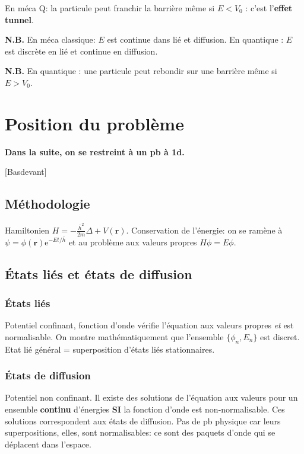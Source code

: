 \documentclass[11pt]{report}
\numberwithin{figure}{section}
\numberwithin{equation}{section}
\numberwithin{table}{section}
\newcommand{\e}{\mathrm{e}}
\newcommand{\1}{\boldsymbol{1}}
\begin{document}
En méca Q: la particule peut franchir la barrière même si $E < V_0$ : c'est l'\textbf{effet tunnel}.

\textbf{N.B.} En méca classique: $E$ est continue dans lié et diffusion. En quantique : $E$ est discrète en lié et continue en diffusion. 

\textbf{N.B.} En quantique : une particule peut rebondir sur une barrière même si $E > V_0$.

\section{Position du problème}  

\textbf{Dans la suite, on se restreint à un pb à 1d.}


[Basdevant] 
  
\subsection{Méthodologie}

Hamiltonien $H = - \frac{\bar{h}^2}{2m} \Delta + V(\bm r)$. Conservation de l'énergie: on se ramène à $\psi = \phi(\bm r) \e^{-Et/\bar{h}}$ et au problème aux valeurs propres $H \phi = E \phi$.


\subsection{États liés et états de diffusion}

\subsubsection{États liés}

Potentiel confinant, fonction d'onde vérifie l'équation aux valeurs propres \emph{et} est normalisable.
On montre mathématiquement que l'ensemble $\{\phi_n, E_n\}$ est discret. Etat lié général = superposition d'états liés stationnaires. 

\subsubsection{États de diffusion}

Potentiel non confinant. Il existe des solutions de l'équation aux valeurs pour un ensemble \textbf{continu} d'énergies \textbf{SI} la fonction d'onde est non-normalisable. Ces solutions correspondent aux états de diffusion. Pas de pb physique car leurs superpositions, elles, sont normalisables: ce sont des paquets d'onde qui se déplacent dans l'espace. 
\end{document}
